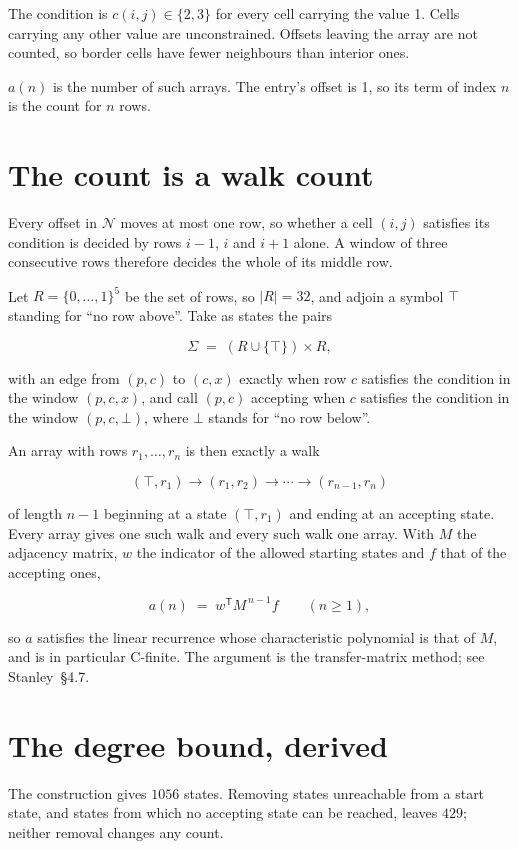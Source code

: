 \documentclass[11pt]{article}
\theoremstyle{definition}
\begin{document}
The condition is $c(i,j) \in \{2, 3\}$ for every cell carrying the value 1. Cells carrying any other value are unconstrained. Offsets leaving the array are not counted, so border cells have fewer neighbours than interior ones.

$a(n)$ is the number of such arrays. The entry's offset is 1, so its term of index $n$ is the count for $n$ rows.

\section{The count is a walk count}

Every offset in $\mathcal{N}$ moves at most one row, so whether a cell $(i,j)$ satisfies its condition is decided by rows $i-1$, $i$ and $i+1$ alone. A window of three consecutive rows therefore decides the whole of its middle row.

Let $R = \{0,\dots,1\}^{5}$ be the set of rows, so $|R| = 32$, and adjoin a symbol $\top$ standing for ``no row above''. Take as states the pairs

\[\Sigma \;=\; (R \cup \{\top\}) \times R,\]

with an edge from $(p,c)$ to $(c,x)$ exactly when row $c$ satisfies the condition in the window $(p,c,x)$, and call $(p,c)$ accepting when $c$ satisfies the condition in the window $(p,c,\bot)$, where $\bot$ stands for ``no row below''.

An array with rows $r_1,\dots,r_n$ is then exactly a walk

\[(\top,r_1) \to (r_1,r_2) \to \cdots \to (r_{n-1},r_n)\]

of length $n-1$ beginning at a state $(\top,r_1)$ and ending at an accepting state. Every array gives one such walk and every such walk one array. With $M$ the adjacency matrix, $w$ the indicator of the allowed starting states and $f$ that of the accepting ones,

\[a(n) \;=\; w^{\mathsf T} M^{\,n-1} f \qquad (n \ge 1),\]

so $a$ satisfies the linear recurrence whose characteristic polynomial is that of $M$, and is in particular C-finite. The argument is the transfer-matrix method; see Stanley~\S4.7.

\section{The degree bound, derived}

The construction gives $1056$ states. Removing states unreachable from a start state, and states from which no accepting state can be reached, leaves $429$; neither removal changes any count.
\end{document}
